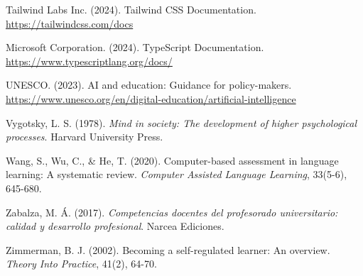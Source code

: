 \documentclass[12pt,a4paper]{report}
\begin{document}
\begin{thebibliography}{99}
Tailwind Labs Inc. (2024). Tailwind CSS Documentation. \url{https://tailwindcss.com/docs}

Microsoft Corporation. (2024). TypeScript Documentation. \url{https://www.typescriptlang.org/docs/}

UNESCO. (2023). AI and education: Guidance for policy-makers. \url{https://www.unesco.org/en/digital-education/artificial-intelligence}

Vygotsky, L. S. (1978). \textit{Mind in society: The development of higher psychological processes}. Harvard University Press.

Wang, S., Wu, C., \& He, T. (2020). Computer-based assessment in language learning: A systematic review. \textit{Computer Assisted Language Learning}, 33(5-6), 645-680.

Zabalza, M. Á. (2017). \textit{Competencias docentes del profesorado universitario: calidad y desarrollo profesional}. Narcea Ediciones.

Zimmerman, B. J. (2002). Becoming a self-regulated learner: An overview. \textit{Theory Into Practice}, 41(2), 64-70.

\end{thebibliography}
\end{document}
